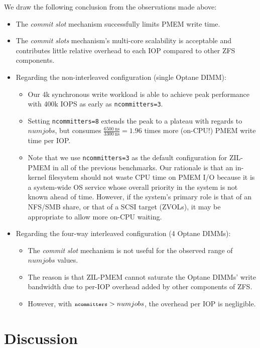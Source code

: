 \documentclass[12pt,a4paper,twoside]{book}
\begin{document}
We draw the following conclusion from the observations made above:
\begin{itemize}[noitemsep]
    \item The \textit{commit slot} mechanism successfully limits PMEM write time.
    \item The \textit{commit slots} mechanism's multi-core scalability is acceptable and contributes little relative overhead to each IOP compared to other ZFS components.
    \item Regarding the non-interleaved configuration (single Optane DIMM):
        \begin{itemize}
            \item Our 4k synchronous write workload is able to achieve peak performance with 400k IOPS as early as \lstinline{ncommitters=3}.
            \item Setting \lstinline{ncommitters=8} extends the peak to a plateau with regards to $numjobs$, but consumes $\frac{6500~\text{ns}}{3300~\text{ns}} = 1.96$ times more (on-CPU!) PMEM write time per IOP.
            \item Note that we use \lstinline{ncommitters=3} as the default configuration for ZIL-PMEM in all of the previous benchmarks.
                Our rationale is that an in-kernel filesystem should not waste CPU time on PMEM I/O because it is a system-wide OS service whose overall priority in the system is not known ahead of time.
                However, if the system's primary role is that of an NFS/SMB share, or that of a SCSI target (ZVOLs), it may be appropriate to allow more on-CPU waiting.
        \end{itemize}
    \item Regarding the four-way interleaved configuration (4 Optane DIMMs):
        \begin{itemize}
            \item The \textit{commit slot} mechanism is not useful for the observed range of $numjobs$ values.
            \item The reason is that ZIL-PMEM cannot saturate the Optane DIMMs' write bandwidth due to per-IOP overhead added by other components of ZFS.
            \item However, with ${\footnotesize\texttt{ncommitters}} > numjobs$, the overhead per IOP is negligible.
        \end{itemize}
\end{itemize}

\section{Discussion}
\end{document}
